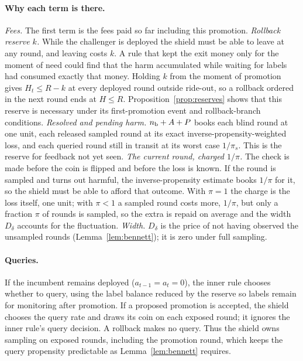 \documentclass[10pt]{article}
\theoremstyle{plain}
\theoremstyle{definition}
\begin{document}
\paragraph{Why each term is there.}
\emph{Fees.} The first term is the fees paid so far including this promotion.
\emph{Rollback reserve $k$.} While the challenger is deployed the shield must be able to leave at any round, and leaving costs $k$. A rule that kept the exit money only for the moment of need could find that the harm accumulated while waiting for labels had consumed exactly that money. Holding $k$ from the moment of promotion gives $H_t\le R-k$ at every deployed round outside ride-out, so a rollback ordered in the next round ends at $H\le R$. Proposition~\ref{prop:reserves} shows that this reserve is necessary under its first-promotion event and rollback-branch conditions.
\emph{Resolved and pending harm.} $n_{\rm b}+A+P$ books each blind round at one unit, each released sampled round at its exact inverse-propensity-weighted loss, and each queried round still in transit at its worst case $1/\pi_s$. This is the reserve for feedback not yet seen.
\emph{The current round, charged $1/\pi$.} The check is made before the coin is flipped and before the loss is known. If the round is sampled and turns out harmful, the inverse-propensity estimate books $1/\pi$ for it, so the shield must be able to afford that outcome. With $\pi=1$ the charge is the loss itself, one unit; with $\pi<1$ a sampled round costs more, $1/\pi$, but only a fraction $\pi$ of rounds is sampled, so the extra is repaid on average and the width $D_\delta$ accounts for the fluctuation.
\emph{Width.} $D_\delta$ is the price of not having observed the unsampled rounds (Lemma~\ref{lem:bennett}); it is zero under full sampling.

\paragraph{Queries.}
If the incumbent remains deployed ($a_{t-1}=a_t=0$), the inner rule chooses whether to query, using the label balance reduced by the reserve so labels remain for monitoring after promotion. If a proposed promotion is accepted, the shield chooses the query rate and draws its coin on each exposed round; it ignores the inner rule's query decision. A rollback makes no query. Thus the shield owns sampling on exposed rounds, including the promotion round, which keeps the query propensity predictable as Lemma~\ref{lem:bennett} requires.
\end{document}

